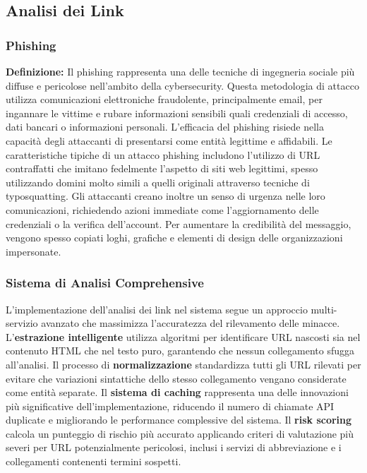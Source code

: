 \documentclass{article}
\begin{document}
\subsection{Analisi dei Link}

\subsubsection{Phishing}
\textbf{Definizione:} Il phishing rappresenta una delle tecniche di ingegneria sociale più diffuse e pericolose nell'ambito della cybersecurity. Questa metodologia di attacco utilizza comunicazioni elettroniche fraudolente, principalmente email, per ingannare le vittime e rubare informazioni sensibili quali credenziali di accesso, dati bancari o informazioni personali. L'efficacia del phishing risiede nella capacità degli attaccanti di presentarsi come entità legittime e affidabili.
\newline \newline
Le caratteristiche tipiche di un attacco phishing includono l'utilizzo di URL contraffatti che imitano fedelmente l'aspetto di siti web legittimi, spesso utilizzando domini molto simili a quelli originali attraverso tecniche di typosquatting. Gli attaccanti creano inoltre un senso di urgenza nelle loro comunicazioni, richiedendo azioni immediate come l'aggiornamento delle credenziali o la verifica dell'account. Per aumentare la credibilità del messaggio, vengono spesso copiati loghi, grafiche e elementi di design delle organizzazioni impersonate.

\subsubsection{Sistema di Analisi Comprehensive}

L'implementazione dell'analisi dei link nel sistema segue un approccio multi-servizio avanzato che massimizza l'accuratezza del rilevamento delle minacce. L'\textbf{estrazione intelligente} utilizza algoritmi per identificare URL nascosti sia nel contenuto HTML che nel testo puro, garantendo che nessun collegamento sfugga all'analisi.
\newline \newline
Il processo di \textbf{normalizzazione} standardizza tutti gli URL rilevati per evitare che variazioni sintattiche dello stesso collegamento vengano considerate come entità separate.
\newline \newline
Il \textbf{sistema di caching } rappresenta una delle innovazioni più significative dell'implementazione, riducendo il numero di chiamate API duplicate e migliorando le performance complessive del sistema. Il \textbf{risk scoring } calcola un punteggio di rischio più accurato applicando criteri di valutazione più severi per URL potenzialmente pericolosi, inclusi i servizi di abbreviazione e i collegamenti contenenti termini sospetti.
\newpage
\end{document}
